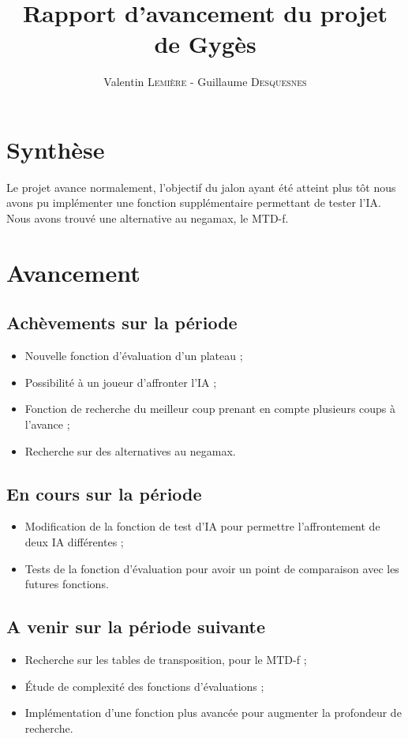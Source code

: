 \documentclass[a4paper]{article}
\title{Rapport d'avancement du projet de Gygès}
\author{Valentin \textsc{Lemière} - Guillaume \textsc{Desquesnes}}
\date{}
\begin{document}
\maketitle

\section*{Synthèse}
	Le projet avance normalement, l'objectif du jalon ayant été atteint plus tôt nous 
	avons pu implémenter une fonction supplémentaire permettant de tester l'IA.
	Nous avons trouvé une alternative au negamax, le MTD-f.

\section*{Avancement}
	\subsection*{Achèvements sur la période}
		\begin{itemize}
			\item Nouvelle fonction d'évaluation d'un plateau ;
			\item Possibilité à un joueur d'affronter l'IA ;
			\item Fonction de recherche du meilleur coup prenant en compte plusieurs coups à l'avance ;
			\item Recherche sur des alternatives au negamax.
		\end{itemize}		
		
	\subsection*{En cours sur la période}
		\begin{itemize}
			\item Modification de la fonction de test d'IA pour permettre l'affrontement de deux IA différentes ;
			\item Tests de la fonction d'évaluation pour avoir un point de comparaison
			avec les futures fonctions.			
		\end{itemize}
	
	\subsection*{A venir sur la période suivante}
		\begin{itemize}
			\item Recherche sur les tables de transposition, pour le MTD-f ;
			\item \'Etude de complexité des fonctions d'évaluations ;
			\item Implémentation d'une fonction plus avancée pour augmenter la profondeur de recherche.
		\end{itemize}
	
\end{document}
